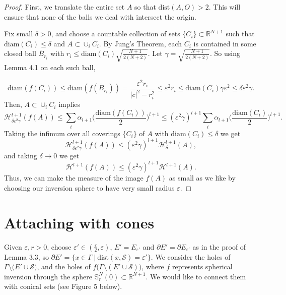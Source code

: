 \documentclass{amsart}
\numberwithin{equation}{section}
\theoremstyle{definition}
\theoremstyle{remark}
\newcommand{\R}{\mathbb{R}}
\begin{document}
\begin{proof} First, we translate the entire set $A$ so that $\text{dist} (A, O)>2$.
This will ensure that none of the balls we deal with intersect the origin.

Fix small $\delta>0$, and choose a countable collection of {sets $\{C_i \} \subset \mathbb{R}^{N+1}$} such that $\text{diam}(C_i) \leq \delta$ and  $A \subset \cup_i C_i$. By Jung's Theorem, each $C_i$ is contained in some closed ball $\overline{B}_{r_i}$ {with $r_i \leq \text{diam}(C_i)\sqrt{\frac{N+1}{2(N+2)}}$. Let $\gamma = \sqrt{\frac{N+1}{2(N+2)}}$.} So using Lemma 4.1 on each such ball,

\[ \text{diam}(f(C_i)) \leq \text{diam}(f(\overline{B}_{r_i})) = \frac{\varepsilon^2 r_i}{|c|^2 - r_i^2} \leq  \varepsilon^2 r_i \leq \text{diam}(C_i)\gamma \varepsilon^2 \leq \delta \varepsilon^2 \gamma . \]
Then, $A \subset \cup_i C_i$ implies
\[ \mathcal{H}^{l+1}_{\delta \varepsilon^2 \gamma} (f(A)) \leq \sum_i \alpha_{l+1} \big(\frac{\text{diam}(f(C_i))}{2} \big)^{l+1} 
\leq (\varepsilon^2 \gamma)^{l+1} \sum_i \alpha_{l+1}\big( \frac{\text{diam}(C_i) }{2} \big)^{l+1}. \]
Taking the infimum over all coverings $\{ C_i \}$ of $A$ with $\text{diam}(C_i) \leq \delta$ we get
\[\mathcal{H}^{l+1}_{\delta \varepsilon^2 \gamma} (f(A)) \leq (\varepsilon^2 \gamma)^{l+1} \mathcal{H}^{l+1}_\delta(A), \]
and taking $\delta \to 0$ we get
\[ \mathcal{H}^{l+1}(f(A)) \leq (\varepsilon^2 \gamma)^{l+1} \mathcal{H}^{l+1}(A). \]
Thus, we can make the measure of the image $f(A)$ as small as we like by choosing our inversion sphere to have very small radius $\varepsilon$.
\end{proof}



\section{Attaching with cones}
Given $\varepsilon,r >0$, choose $\varepsilon'\in (\frac{\varepsilon}2, \varepsilon)$, $E'=E_{\varepsilon'}$ and $\partial E'=\partial E_{\varepsilon'}$
as in the proof of Lemma 3.3, so $ \partial E' = \big\{x \in \Gamma \  \big|\    \text{dist}(x,\mathcal{S})=\varepsilon' \big\}.$ We consider the holes of 
$\Gamma \setminus \big(E' \cup \mathcal{S}\big)$, and the holes of $f\big(\Gamma \setminus (E' \cup \mathcal{S})\big)$, where $f$ represents spherical inversion through the sphere 
{$\mathbb{S}^{N}_r(0)\subset\R^{N+1}$}. We would like to connect them with conical sets (see Figure 5 below).
\end{document}
